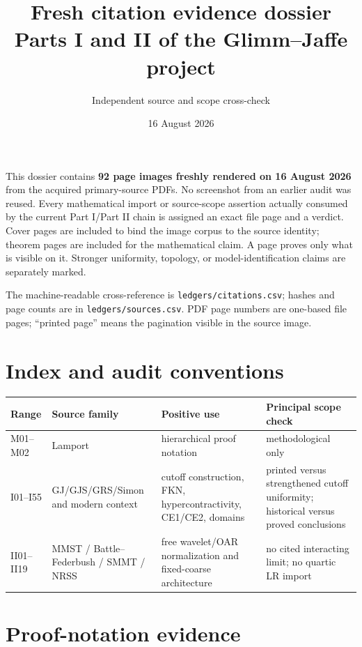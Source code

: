 \documentclass[10pt,a4paper]{article}
\title{Fresh citation evidence dossier\\[3pt]
\large Parts I and II of the Glimm--Jaffe project}
\author{Independent source and scope cross-check}
\date{16 August 2026}
\begin{document}
\maketitle

\begin{resultbox}
This dossier contains \textbf{92 page images freshly rendered on 16 August 2026} from
the acquired primary-source PDFs.  No screenshot from an earlier audit was reused.
Every mathematical import or source-scope assertion actually consumed by the current
Part I/Part II chain is assigned an exact file page and a verdict.  Cover pages are
included to bind the image corpus to the source identity; theorem pages are included
for the mathematical claim.  A page proves only what is visible on it.  Stronger
uniformity, topology, or model-identification claims are separately marked.

The machine-readable cross-reference is
\texttt{ledgers/citations.csv}; hashes and page counts are in
\texttt{ledgers/sources.csv}.  PDF page numbers are one-based file pages; ``printed
page'' means the pagination visible in the source image.
\end{resultbox}

\tableofcontents

\section{Index and audit conventions}

\begin{longtable}{P{1.8cm}P{3.3cm}P{4.4cm}P{4.8cm}}
\toprule
Range & Source family & Positive use & Principal scope check\\
\midrule\endhead
M01--M02 & Lamport & hierarchical proof notation & methodological only\\
I01--I55 & GJ/GJS/GRS/Simon and modern context & cutoff construction, FKN,
hypercontractivity, CE1/CE2, domains & printed versus strengthened cutoff
uniformity; historical versus proved conclusions\\
II01--II19 & MMST / Battle--Federbush / SMMT / NRSS & free wavelet/OAR normalization and
fixed-coarse architecture & no cited interacting limit; no quartic LR import\\
\bottomrule
\end{longtable}

\section{Proof-notation evidence}
\end{document}
